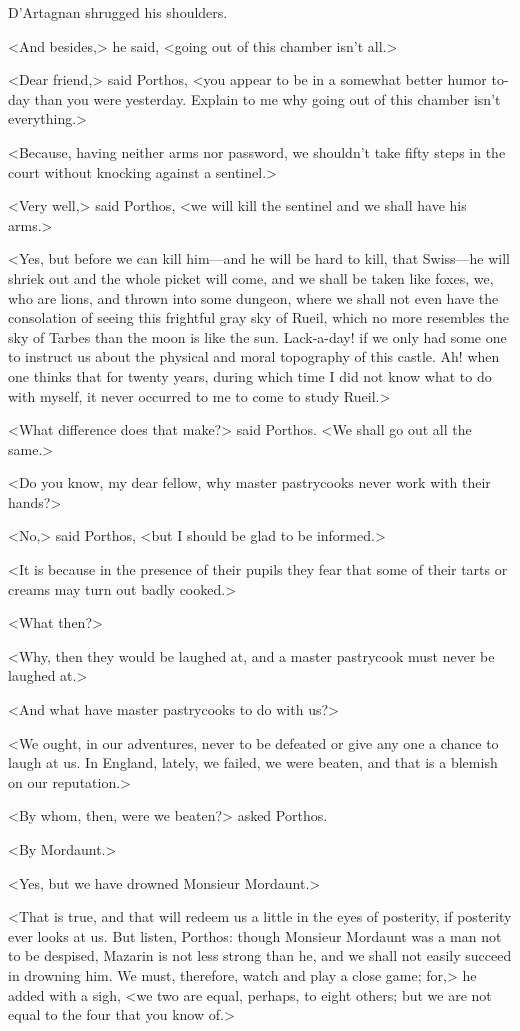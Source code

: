 D'Artagnan shrugged his shoulders.

<And besides,> he said, <going out of this chamber isn't all.>

<Dear friend,> said Porthos, <you appear to be in a somewhat better humor to-day than you were yesterday. Explain to me why going out of this chamber isn't everything.>

<Because, having neither arms nor password, we shouldn't take fifty steps in the court without knocking against a sentinel.>

<Very well,> said Porthos, <we will kill the sentinel and we shall have his arms.>

<Yes, but before we can kill him—and he will be hard to kill, that Swiss—he will shriek out and the whole picket will come, and we shall be taken like foxes, we, who are lions, and thrown into some dungeon, where we shall not even have the consolation of seeing this frightful gray sky of Rueil, which no more resembles the sky of Tarbes than the moon is like the sun. Lack-a-day! if we only had some one to instruct us about the physical and moral topography of this castle. Ah! when one thinks that for twenty years, during which time I did not know what to do with myself, it never occurred to me to come to study Rueil.>

<What difference does that make?> said Porthos. <We shall go out all the same.>

<Do you know, my dear fellow, why master pastrycooks never work with their hands?>

<No,> said Porthos, <but I should be glad to be informed.>

<It is because in the presence of their pupils they fear that some of their tarts or creams may turn out badly cooked.>

<What then?>

<Why, then they would be laughed at, and a master pastrycook must never be laughed at.>

<And what have master pastrycooks to do with us?>

<We ought, in our adventures, never to be defeated or give any one a chance to laugh at us. In England, lately, we failed, we were beaten, and that is a blemish on our reputation.>

<By whom, then, were we beaten?> asked Porthos.

<By Mordaunt.>

<Yes, but we have drowned Monsieur Mordaunt.>

<That is true, and that will redeem us a little in the eyes of posterity, if posterity ever looks at us. But listen, Porthos: though Monsieur Mordaunt was a man not to be despised, Mazarin is not less strong than he, and we shall not easily succeed in drowning him. We must, therefore, watch and play a close game; for,> he added with a sigh, <we two are equal, perhaps, to eight others; but we are not equal to the four that you know of.>

